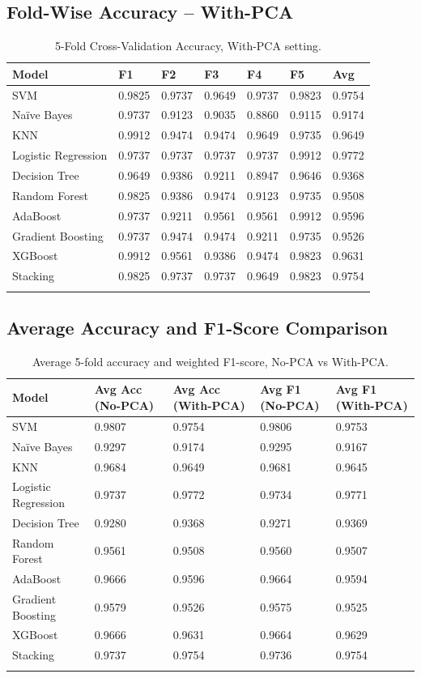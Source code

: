 \documentclass[12pt,a4paper]{article}
\begin{document}
\subsection{Fold-Wise Accuracy -- With-PCA}
\begin{longtable}{|p{2.6cm}|p{1.1cm}p{1.1cm}p{1.1cm}p{1.1cm}p{1.1cm}|p{1.4cm}|}
\hline
\textbf{Model} & \textbf{F1} & \textbf{F2} & \textbf{F3} & \textbf{F4} & \textbf{F5} & \textbf{Avg} \\ \hline
SVM & 0.9825 & 0.9737 & 0.9649 & 0.9737 & 0.9823 & 0.9754 \\
Na\"ive Bayes & 0.9737 & 0.9123 & 0.9035 & 0.8860 & 0.9115 & 0.9174 \\
KNN & 0.9912 & 0.9474 & 0.9474 & 0.9649 & 0.9735 & 0.9649 \\
Logistic Regression & 0.9737 & 0.9737 & 0.9737 & 0.9737 & 0.9912 & 0.9772 \\
Decision Tree & 0.9649 & 0.9386 & 0.9211 & 0.8947 & 0.9646 & 0.9368 \\
Random Forest & 0.9825 & 0.9386 & 0.9474 & 0.9123 & 0.9735 & 0.9508 \\
AdaBoost & 0.9737 & 0.9211 & 0.9561 & 0.9561 & 0.9912 & 0.9596 \\
Gradient Boosting & 0.9737 & 0.9474 & 0.9474 & 0.9211 & 0.9735 & 0.9526 \\
XGBoost & 0.9912 & 0.9561 & 0.9386 & 0.9474 & 0.9823 & 0.9631 \\
Stacking & 0.9825 & 0.9737 & 0.9737 & 0.9649 & 0.9823 & 0.9754 \\
\hline
\caption{5-Fold Cross-Validation Accuracy, With-PCA setting.}
\label{tab:cv-withpca}
\end{longtable}

\subsection{Average Accuracy and F1-Score Comparison}
\begin{longtable}{|p{2.8cm}|p{2cm}|p{2cm}|p{2cm}|p{2cm}|}
\hline
\textbf{Model} & \textbf{Avg Acc (No-PCA)} & \textbf{Avg Acc (With-PCA)} & \textbf{Avg F1 (No-PCA)} & \textbf{Avg F1 (With-PCA)} \\ \hline
SVM & 0.9807 & 0.9754 & 0.9806 & 0.9753 \\
Na\"ive Bayes & 0.9297 & 0.9174 & 0.9295 & 0.9167 \\
KNN & 0.9684 & 0.9649 & 0.9681 & 0.9645 \\
Logistic Regression & 0.9737 & 0.9772 & 0.9734 & 0.9771 \\
Decision Tree & 0.9280 & 0.9368 & 0.9271 & 0.9369 \\
Random Forest & 0.9561 & 0.9508 & 0.9560 & 0.9507 \\
AdaBoost & 0.9666 & 0.9596 & 0.9664 & 0.9594 \\
Gradient Boosting & 0.9579 & 0.9526 & 0.9575 & 0.9525 \\
XGBoost & 0.9666 & 0.9631 & 0.9664 & 0.9629 \\
Stacking & 0.9737 & 0.9754 & 0.9736 & 0.9754 \\
\hline
\caption{Average 5-fold accuracy and weighted F1-score, No-PCA vs With-PCA.}
\label{tab:avg-comparison}
\end{longtable}
\end{document}
